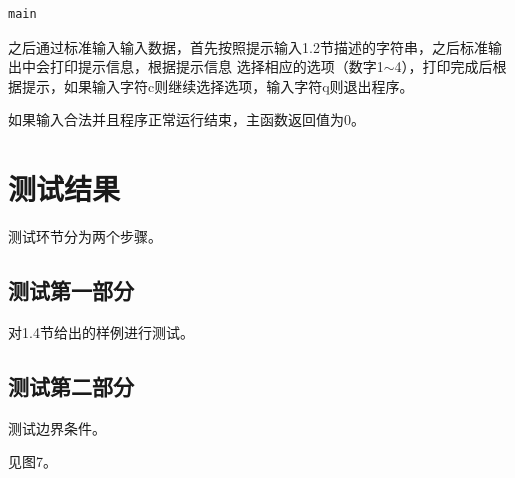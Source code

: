 \documentclass{article}
\begin{document}
\begin{lstlisting}[language={bash},
    basicstyle=\small\consolas]
main
\end{lstlisting}

之后通过标准输入输入数据，首先按照提示输入1.2节描述的字符串，之后标准输出中会打印提示信息，根据提示信息
选择相应的选项（数字1$\sim$4），打印完成后根据提示，如果输入字符c则继续选择选项，输入字符q则退出程序。

如果输入合法并且程序正常运行结束，主函数返回值为0。

\section{测试结果}

测试环节分为两个步骤。

\subsection{测试第一部分}

对1.4节给出的样例进行测试。

\subsection{测试第二部分}

测试边界条件。

见图7。
\end{document}
